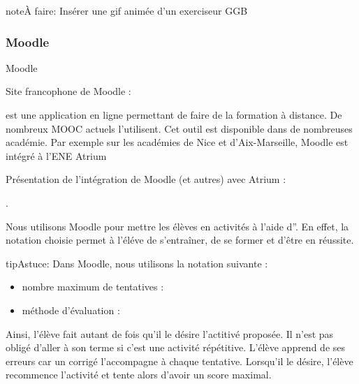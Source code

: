 \documentclass[letterpaper,10pt,french]{sphinxmanual}
\begin{document}
\begin{sphinxadmonition}{note}{\label{projet-description:index-0}À faire:}
Insérer une gif animée d’un exerciseur GGB
\end{sphinxadmonition}


\subsubsection{Moodle}
\label{\detokenize{projet-description:moodle}}
Moodle %
\begin{footnote}[3]\sphinxAtStartFootnote
Site francophone de Moodle : 
%
\end{footnote} est une application en ligne permettant de faire de la formation à distance. De nombreux MOOC actuels l’utilisent. Cet outil est disponible dans de nombreuses académie. Par exemple sur les académies de Nice et d’Aix-Marseille, Moodle est intégré à l’ENE Atrium %
\begin{footnote}[4]\sphinxAtStartFootnote
Présentation de l’intégration de Moodle (et autres) avec Atrium : 
%
\end{footnote}.

Nous utilisons Moodle pour mettre les élèves en activités à l’aide d”. En effet, la notation choisie permet à l’éléve de s’entraîner, de se former et d’être en réussite.

\begin{sphinxadmonition}{tip}{Astuce:}
Dans Moodle, nous utilisons la notation suivante :
\begin{itemize}
\item {} 
nombre maximum de tentatives : 

\item {} 
méthode d’évaluation : 

\end{itemize}

\noindent{}
\end{sphinxadmonition}

Ainsi, l’élève fait autant de fois qu’il le désire l’actitivé proposée. Il n’est pas obligé d’aller à son terme si c’est une activité répétitive. L’élève apprend de ses erreurs car un corrigé l’accompagne à chaque tentative. Lorsqu’il le désire, l’élève recommence l’activité et tente alors d’avoir un score maximal.
\end{document}
